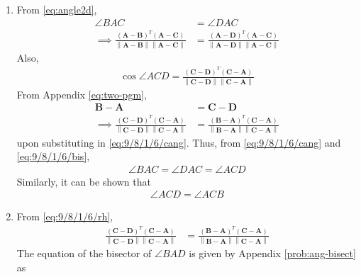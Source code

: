 \documentclass[a4paper,12pt,twocolumn]{article}
\providecommand{\norm}[1]{\left\lVert#1\right\rVert}
\let\vec\mathbf
\providecommand{\brak}[1]{\ensuremath{\left((#1\right)}}
\begin{document}
\begin{enumerate}
	\item From 
    \eqref{eq:angle2d},
\begin{align}
	 \label{eq:9/8/1/6/bis}
	\angle{BAC}
	&= \angle{DAC}
	\\
\implies  \frac{(\vec{A}-\vec{B})^T(\vec{A}-\vec{C})}{\norm{\vec{A}-\vec{B}}\norm{\vec{A}-\vec{C}}}
	& = \frac{(\vec{A}-\vec{D})^T(\vec{A}-\vec{C})}{\norm{\vec{A}-\vec{D}}\norm{\vec{A}-\vec{C}}}
%
\end{align}
Also, 
\begin{align}
\cos	\angle{ACD}
	 = \frac{(\vec{C}-\vec{D})^T(\vec{C}-\vec{A})}{\norm{\vec{C}-\vec{D}}\norm{\vec{C}-\vec{A}}}
	 \label{eq:9/8/1/6/cang}
%
\end{align}
From Appendix
	  \ref{eq:two-pgm}, 
  \begin{align}
	  \vec{B}-\vec{A} &= \vec{C} -\vec{D}
	  \\
	  \implies 
	  \frac{(\vec{C}-\vec{D})^T(\vec{C}-\vec{A})}{\norm{\vec{C}-\vec{D}}\norm{\vec{C}-\vec{A}}}
	  &= \frac{(\vec{B}-\vec{A})^T(\vec{C}-\vec{A})}{\norm{\vec{B}-\vec{A}}\norm{\vec{C}-\vec{A}}}
	 \label{eq:9/8/1/6/rh}
  \end{align}
  upon substituting in 
	 \eqref{eq:9/8/1/6/cang}. Thus, from 
	 \eqref{eq:9/8/1/6/cang}
	 and 
	 \eqref{eq:9/8/1/6/bis}, 
\begin{align}
	\angle{BAC}
	= \angle{DAC}
	=
	\angle{ACD}
  \end{align}
  Similarly, it can be shown that 
  \begin{align}
	\angle{ACD}
	=
	\angle{ACB}
  \end{align}
  \item 
  \iffalse
From 
	 \eqref{eq:9/8/1/6/rh}, 
  \begin{align}
	  \frac{(\vec{C}-\vec{D})^T(\vec{C}-\vec{A})}{\norm{\vec{C}-\vec{D}}\norm{\vec{C}-\vec{A}}}
	  &= \frac{(\vec{B}-\vec{A})^T(\vec{C}-\vec{A})}{\norm{\vec{B}-\vec{A}}\norm{\vec{C}-\vec{A}}}
  \end{align}
The equation of the bisector of $\angle BAD$ is given by Appendix  
	\ref{prob:ang-bisect} as
\begin{align}
	 \label{eq:9/8/1/6/ac}

\end{align}
\end{enumerate}
\end{document}
